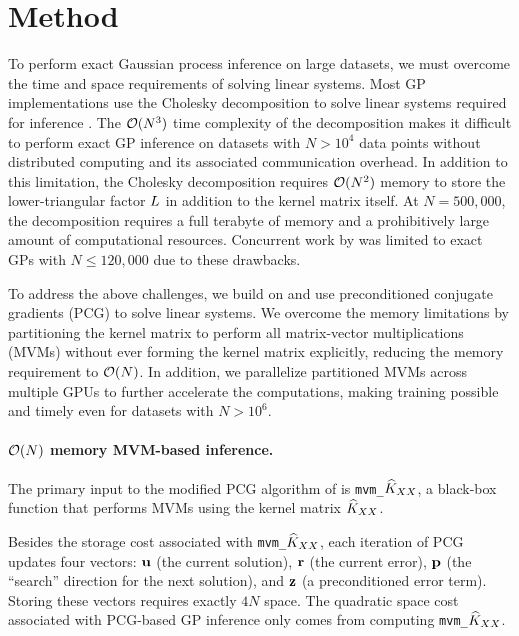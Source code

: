 \section{Method}
\label{sec:method}
To perform exact Gaussian process inference on large datasets, we must overcome
the time and space requirements of solving linear systems.
Most GP implementations use the Cholesky decomposition to
solve linear systems required for inference \cite{rasmussen2006gaussian}.
The $\bigo{N^3}$ time complexity of the decomposition makes it difficult to perform exact GP inference on datasets with $N > 10^4$ data points without distributed computing and its associated communication overhead.
In addition to this limitation, the Cholesky decomposition requires
$\bigo{N^2}$ memory to store the lower-triangular factor $L$ in addition to the kernel matrix itself.
At $N=500,\!000$, the decomposition requires a full terabyte of memory and a prohibitively large
amount of computational resources.
Concurrent work by \citet{nguyen2019exact} was limited to exact GPs with $N \leq 120,\!000$ due to these drawbacks.

To address the above challenges, we build on \citet{gardner2018gpytorch} and use preconditioned conjugate gradients (PCG) to solve
linear systems. We overcome the memory limitations by partitioning the kernel
matrix to perform all matrix-vector multiplications (MVMs) without ever forming the kernel matrix explicitly,
reducing the memory requirement to $\bigo{N}$. In addition, we parallelize partitioned MVMs across multiple GPUs to
further accelerate the computations, making training possible and timely even for datasets with $N > 10^6$.

\paragraph{$\bigo{N}$ memory MVM-based inference.}
The primary input to the modified PCG algorithm of \citet{gardner2018gpytorch} is {\tt mvm\_$\widehat{K}_{XX}$}, a
black-box function that performs MVMs using the kernel matrix $\widehat{K}_{XX}$.

Besides the storage cost associated with {\tt mvm\_$\widehat{K}_{XX}$}, each iteration
of PCG updates four vectors: $\mathbf{u}$ (the current solution), $\mathbf{r}$ (the current error),
$\mathbf{p}$ (the ``search'' direction for the next solution), and $\mathbf{z}$ (a
preconditioned error term). Storing these vectors requires exactly $4N$ space.
The quadratic space cost associated with PCG-based GP inference only comes from computing {\tt mvm\_$\widehat{K}_{XX}$}.

